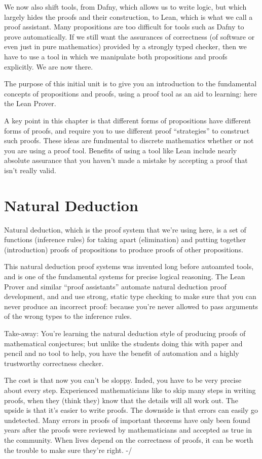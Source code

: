 \documentclass[letterpaper,10pt,english]{sphinxmanual}
\begin{document}
We now also shift tools, from Dafny, which allows us to write logic,
but which largely hides the proofs and their construction, to Lean,
which is what we call a proof assistant.  Many propositions are too
difficult for tools such as Dafny to prove automatically. If we still
want the assurances of correctness (of software or even just in pure
mathematics) provided by a strongly typed checker, then we have to use
a tool in which we manipulate both propositions and proofs
explicitly. We are now there.

The purpose of this initial unit is to give you an introduction to the
fundamental concepts of propositions and proofs, using a proof tool as
an aid to learning: here the Lean Prover.

A key point in this chapter is that different forms of propositions
have different forms of proofs, and require you to use different proof
“strategies” to construct such proofs. These ideas are fundmental to
discrete mathematics whether or not you are using a proof tool.
Benefits of using a tool like Lean include nearly absolute assurance
that you haven’t made a mistake by accepting a proof that isn’t really
valid.


\section{Natural Deduction}
\label{\detokenize{15-proofs:natural-deduction}}
Natural deduction, which is the proof system that we’re using here, is
a set of functions (inference rules) for taking apart (elimination)
and putting together (introduction) proofs of propositions to produce
proofs of other propositions.

This natural deduction proof systems was invented long before
autoamted tools, and is one of the fundamental systems for precise
logical reasoning. The Lean Prover and similar “proof assistants”
automate natural deduction proof development, and and use strong,
static type checking to make sure that you can never produce an
incorrect proof: because you’re never allowed to pass arguments of the
wrong types to the inference rules.

Take-away: You’re learning the natural deduction style of producing
proofs of mathematical conjectures; but unlike the students doing this
with paper and pencil and no tool to help, you have the benefit of
automation and a highly trustworthy correctness checker.

The cost is that now you can’t be sloppy.  Inded, you have to be very
precise about every step. Experienced mathematicians like to skip many
steps in writing proofs, when they (think they) know that the details
will all work out. The upside is that it’s easier to write proofs.
The downside is that errors can easily go undetected. Many errors in
proofs of important theorems have only been found years after the
proofs were reviewed by mathematicians and accepted as true in the
community. When lives depend on the correctness of proofs, it can be
worth the trouble to make sure they’re right.  -/
\end{document}
